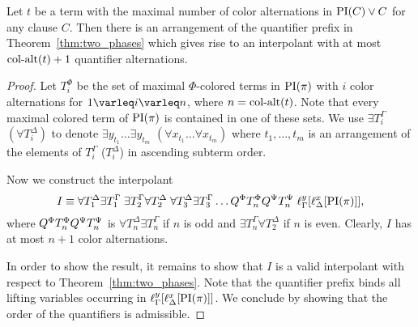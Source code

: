 \documentclass[%
	draft=false,%
	numbers=noendperiod,%
	11pt,%
	a4paper,%
	oneside,%
	openany,%
]{memoir}
\begin{document}
\begin{lemma}
	\label{lemma:quant_alt_upper_bound}
	Let $t$ be a term with the maximal number of color alternations in $\operatorname{PI}(C) \lor C$ for any clause $C$.
	Then there is an arrangement of the quantifier prefix in Theorem~\ref{thm:two_phases} which gives rise to an interpolant 
	with at most $\operatorname{col-alt}(t)+1$ quantifier alternations.
\end{lemma}
\begin{proof}
	Let $T_i^\Phi$ be the set of maximal $\Phi$-colored terms in $\operatorname{PI}(\pi)$ with $i$ color alternations for $1\varleq i \varleq n$, where $n=\operatorname{col-alt}(t)$.
	Note that every maximal colored term of $\operatorname{PI}(\pi)$ is contained in one of these sets.
	We use $\exists T_i^\Gamma$ $(\forall T_i^\Delta)$ to denote $ \exists y_{t_1} \dots \exists y_{t_m}$ $(\forall x_{t_1}\dots\forall x_{t_m})$ where $t_1, \dots, t_m$ is an arrangement of the elements of $T_i^\Gamma$ ($T_i^\Delta$) in ascending subterm order. 


	Now we construct the interpolant
	\[
		I \equiv 
		\forall T_1^\Delta \exists T_1^\Gamma \;
		\exists T_2^\Gamma \forall T_2^\Delta \;
		\forall T_3^\Delta \exists T_3^\Gamma
		\dots 
		Q^\Phi T_n^\Phi Q^\Psi T_n^\Psi
		\;
		\ell_{\Gamma}^{y}[\ell_{\Delta}^{x}[\operatorname{PI}(\pi)]],
	\]
	where $ Q^\Phi T_n^\Phi Q^\Psi T_n^\Psi $ is
	$\forall T_n^\Delta \exists T_n^\Gamma $ if $n$ is odd and 
	$\exists T_n^\Gamma \forall T_2^\Delta $ if $n$ is even.
	Clearly, $I$ has at most $n+1$ color alternations.

	In order to show the result, it remains to show that $I$ is a valid interpolant with respect to Theorem~\ref{thm:two_phases}. 
	Note that the quantifier prefix binds all lifting variables occurring in  
	$\ell_{\Gamma}^{y}[\ell_{\Delta}^{x}[\operatorname{PI}(\pi)]]$.
	We conclude by showing that the order of the quantifiers is admissible.


\end{proof}
\end{document}
